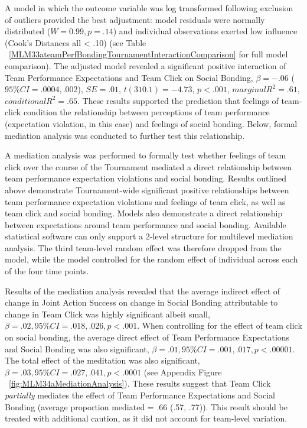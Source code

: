 A model in which the outcome variable was log transformed following exclusion of outliers provided the best adjustment: model residuals were normally distributed ($W = 0.99, p = .14$) and individual observations exerted low influence (Cook's Distances all < .10) (see Table ~\ref{MLM33ateamPerfBondingTournamentInteractionComparison} for full model comparison). The adjusted model revealed a significant positive interaction of Team Performance Expectations and Team Click on Social Bonding, $\beta = -.06$ ($95\% CI =  .0004, .002$), $SE = .01$, $t(310.1) = -4.73$, $p < .001$, $marginal R^2 = .61$, $conditional R^2 = .65$. These results supported the prediction that feelings of team-click condition the relationship between perceptions of team performance (expectation violation, in this case) and feelings of social bonding.  Below, formal mediation analysis was conducted to further test this relationship.


       

A mediation analysis was performed to formally test whether feelings of team click over the course of the Tournament mediated a direct relationship between team performance expectation violations and social bonding.  Results outlined above demonstrate Tournament-wide significant positive relationships between team performance expectation violations and feelings of team click, as well as team click and social bonding. Models also demonstrate a direct relationship between expectations around team performance and social bonding.  Available statistical software can only support a 2-level structure for multilevel mediation analysis. The third team-level random effect was therefore dropped from the model, while the model controlled for the random effect of individual across each of the four time points.

Results of the mediation analysis revealed that the average indirect effect of change in Joint Action Success on change in Social Bonding attributable to change in Team Click was highly significant albeit small, $\beta = .02, 95\% CI = .018 , .026, p < .001$.  When controlling for the effect of team click on social bonding, the average direct effect of Team Performance Expectations and Social Bonding was also significant, $\beta = .01, 95\% CI = .001 , .017, p < .00001$.  The total effect of the meditation was also significant, $\beta = .03, 95\% CI = .027, .041, p < .0001$ (see Appendix Figure ~\ref{fig:MLM34aMediationAnalysis}).  These results suggest that Team Click \textit{partially} mediates the effect of Team Performance Expectations and Social Bonding (average proportion mediated = .66 (.57, .77)).  This result should be treated with additional caution, as it did not account for team-level variation.

